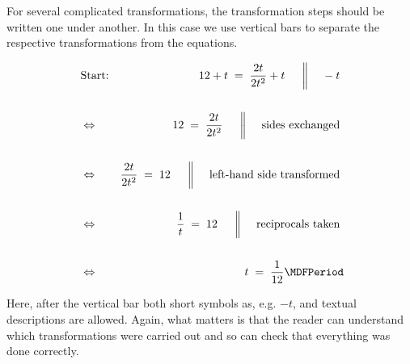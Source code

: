 \begin{MIntro}
\begin{MExample}
For several complicated transformations, the transformation steps should be written one under another.
In this case we use vertical bars to separate the respective transformations from the equations. 

\begin{eqnarray*}
& \text{Start:} & 12+t \;=\;\Mdfrac{2t}{2t^2}+t \ \ \ \ \MSep \ -t\ \\ \ \\
& \Leftrightarrow & 12 \;=\; \Mdfrac{2t}{2t^2}  \ \ \ \ \MSep \ \text{sides exchanged}\ \\ \ \\
& \Leftrightarrow & \Mdfrac{2t}{2t^2} \;=\; 12  \ \ \ \ \MSep \ \text{left-hand side transformed}\ \\ \ \\
& \Leftrightarrow & \Mdfrac1t \;=\; 12  \ \ \ \ \MSep \ \text{reciprocals taken}\ \\ \ \\
& \Leftrightarrow & t \;=\; \Mdfrac{1}{12} \MDFPeriod
\end{eqnarray*}

Here, after the vertical bar both short symbols as, e.g. $-t$, and textual descriptions are allowed. 
Again, what matters is that the reader can understand which transformations were carried out and so can check that everything was done correctly.

\end{MExample}
\end{MIntro}

